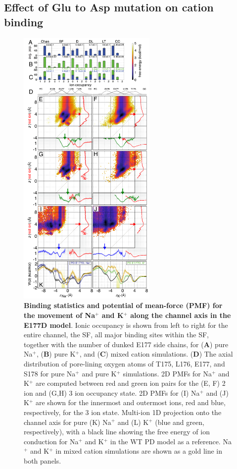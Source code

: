 \begin{refsection}
\subsection{Effect of Glu to Asp mutation on cation binding}

\begin{figure}[hp]
\centering
\includegraphics[width=0.6\textwidth]{nav2/Nav2Fig6}
\caption[Binding statistics and potential of mean-force (PMF) for the movement of Na$^+$ and K$^+$ along the channel axis in the E177D model]{\textbf{Binding statistics and potential of mean-force (PMF) for the movement of Na$^+$ and K$^+$ along the channel axis in the E177D model}. Ionic occupancy is shown from left to right for the entire channel, the SF, all major binding sites within the SF, together with the number of dunked E177 side chains, for (\textbf{A}) pure Na$^+$, (\textbf{B}) pure K$^+$, and (\textbf{C}) mixed cation simulations. (\textbf{D}) The axial distribution of pore-lining oxygen atoms of T175, L176, E177, and S178 for pure Na$^+$ and pure K$^+$ simulations. 2D PMFs for Na$^+$ and K$^+$ are computed between red and green ion pairs for the (E, F) 2 ion and (G,H) 3 ion occupancy state. 2D PMFs for (I) Na$^+$ and (J) K$^+$ are shown for the innermost and outermost ions, red and blue, respectively, for the 3 ion state. Multi-ion 1D projection onto the channel axis for pure (K) Na$^+$ and (L) K$^+$ (blue and green, respectively), with a black line showing the free energy of ion conduction for Na$^+$ and K$^+$ in the WT PD model as a reference. Na$^+$ and K$^+$ in mixed cation simulations are shown as a gold line in both panels.}
\label{fig:nav2fig6}
\end{figure}


\end{refsection}
